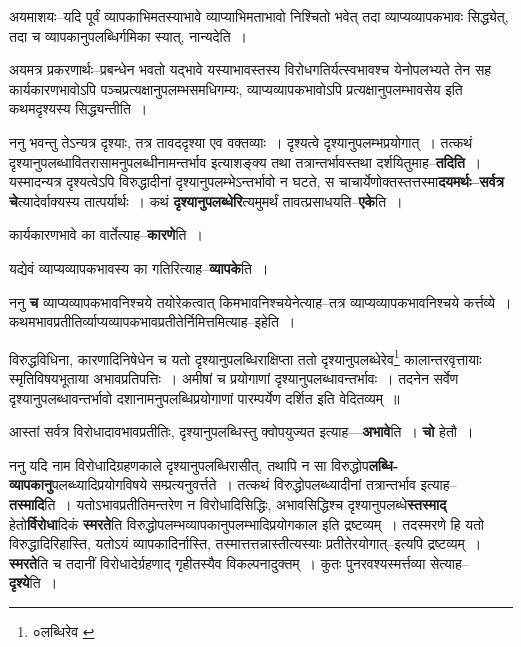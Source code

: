 \documentclass[article,12pt,a4paper]{memoir}
\begin{document}
	  \pstart अयमाशयः--यदि पूर्वं व्यापकाभिमतस्याभावे व्याप्याभिमताभावो निश्चितो भवेत् तदा व्याप्यव्यापकभावः सिद्ध्येत्, तदा च व्यापकानुपलब्धिर्गमिका स्यात्, नान्यदेति ।
	\pend
      

	  \pstart अयमत्र प्रकरणार्थः--प्रबन्धेन भवतो यद्भावे यस्याभावस्तस्य विरोधगतिर्यत्स्वभावश्च येनोपलभ्यते तेन सह कार्यकारणभावोऽपि पञ्चप्रत्यक्षानुपलम्भसमधिगम्यः, व्याप्यव्यापकभावोऽपि प्रत्यक्षानुपलम्भावसेय इति कथमदृश्यस्य सिद्ध्यन्तीति ।
	\pend
      

	  \pstart ननु भवन्तु तेऽन्यत्र दृश्याः, तत्र तावददृश्या एव वक्तव्याः । दृश्यत्वे दृश्यानुपलम्भप्रयोगात् । तत्कथं दृश्यानुपलब्धावितरासामनुपलब्धीनामन्तर्भाव इत्याशङ्क्य तथा तत्रान्तर्भावस्तथा दर्शयितुमाह--\textbf{तदिति} । यस्मादन्यत्र दृश्यत्वेऽपि विरुद्धादीनां दृश्यानुपलम्भेऽन्तर्भावो न घटते, स चाचार्येणोक्तस्तत्तस्मा\textbf{दयमर्थः--सर्वत्र चे}त्यादेर्वाक्यस्य तात्पर्यार्थः । कथं \textbf{दृश्यानुपलब्धेरि}त्यमुमर्थं तावत्प्रसाधयति--\textbf{एके}ति ।
	\pend
      

	  \pstart कार्यकारणभावे का वार्तेत्याह--\textbf{कारणे}ति ।
	\pend
      

	  \pstart यद्येवं व्याप्यव्यापकभावस्य का गतिरित्याह--\textbf{व्यापके}ति ।
	\pend
      

	  \pstart ननु \textbf{च} व्याप्यव्यापकभावनिश्चये तयोरेकत्वात् किमभावनिश्चयेनेत्याह--तत्र व्याप्यव्यापकभावनिश्चये कर्त्त\leavevmode{}व्ये । कथमभावप्रतीतिर्व्याप्यव्यापकभावप्रतीतेर्निमित्तमित्याह--इहेति ।
	\pend
      \leavevmode{}
	  \bigskip
	  \begingroup
	

	  \pstart विरुद्धविधिना, कारणादिनिषेधेन च यतो दृश्यानुपलब्धिराक्षिप्ता ततो दृश्यानुपलब्धेरेव\footnote{०लब्धिरेव \cite{dp-msC}} कालान्तरवृत्तायाः स्मृतिविषयभूताया अभावप्रतिपत्तिः । अमीषां च प्रयोगाणां दृश्यानुपलब्धावन्तर्भावः । तदनेन सर्वेण दृश्यानुपलब्धावन्तर्भावो दशानामनुपलब्धिप्रयोगाणां पारम्पर्येण दर्शित इति वेदितव्यम् ॥
	\pend
      
	  \endgroup
	

	  \pstart आस्तां सर्वत्र विरोधादावभावप्रतीतिः, दृश्यानुपलब्धिस्तु क्वोपयुज्यत इत्याह—\textbf{अभावे}ति । \textbf{चो} हेतौ ।
	\pend
      

	  \pstart ननु यदि नाम विरोधादिग्रहणकाले दृश्यानुपलब्धिरासीत्, तथापि न सा विरुद्धोप\textbf{लब्धि-व्यापकानु}पलब्ध्यादिप्रयोगविषये सम्प्रत्यनुवर्त्तते । तत्कथं विरुद्धोपलब्ध्यादीनां तत्रान्तर्भाव इत्याह--\textbf{तस्मादि}ति । यतोऽभावप्रतीतिमन्तरेण न विरोधादिसिद्धिः, अभावसिद्धिश्च दृश्यानुपलब्धे\textbf{स्तस्माद्} हेतो\textbf{र्विरोधा}दिकं \textbf{स्मरते}ति विरुद्धोपलम्भव्यापकानुपलम्भादिप्रयोगकाल इति द्रष्टव्यम् । तदस्मरणे हि यतो विरुद्धादिरिहास्ति, यतोऽयं व्यापकादिर्नास्ति, तस्मात्तत्तन्नास्तीत्यस्याः प्रतीतेरयोगात्--इत्यपि द्रष्टव्यम् । \textbf{स्मरते}ति च तदानीं विरोधादेर्ग्रहणाद् गृहीतस्यैव विकल्पनादुक्तम् । कुतः पुनरवश्यस्मर्त्तव्या सेत्याह--\textbf{दृश्ये}ति ।
	\pend
      
\end{document}
